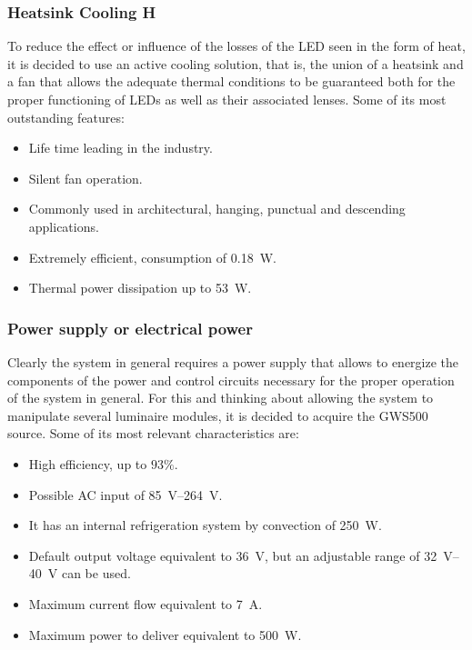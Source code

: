 \documentclass[letterpaper,12pt,twoside]{articleingud}
\begin{document}
\subsubsection{Heatsink Cooling H}
To reduce the effect or influence of the losses of the LED seen in the form of heat, it is decided to use an active cooling solution, that is, the union of a heatsink and a fan that allows the adequate thermal conditions to be guaranteed both for the proper functioning of LEDs as well as their associated lenses. Some of its most outstanding features:\cite{disipador} 
\begin{itemize}
    \item Life time leading in the industry.
    \item Silent fan operation.
    \item Commonly used in architectural, hanging, punctual and descending applications.
    \item Extremely efficient, consumption of \SI{0.18}{\watt}.
    \item Thermal power dissipation up to \SI{53}{\watt}.
\end{itemize}

\subsubsection{Power supply or electrical power}
Clearly the system in general requires a power supply that allows to energize the components of the power and control circuits necessary for the proper operation of the system in general. For this and thinking about allowing the system to manipulate several luminaire modules, it is decided to acquire the GWS500 source. Some of its most relevant characteristics are:\cite{fuenteDC}
\begin{itemize}
    \item High efficiency, up to $93\%$.
    \item Possible AC input of \SIrange{85}{264}{\volt}.
    \item It has an internal refrigeration system by convection of \SI{250}{\watt}.
    \item Default output voltage equivalent to \SI{36}{\volt}, but an adjustable range of \SIrange{32}{40}{\volt} can be used.
    \item Maximum current flow equivalent to \SI{7}{\ampere}.
    \item Maximum power to deliver equivalent to \SI{500}{\watt}.
\end{itemize}
\end{document}
